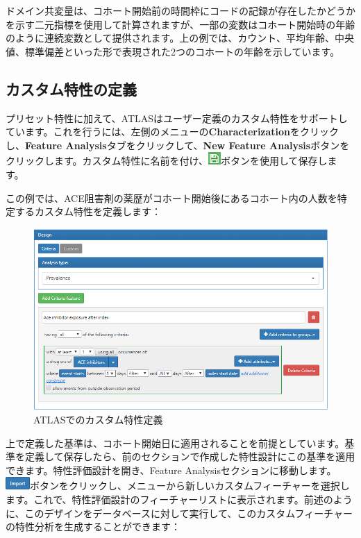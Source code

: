 \documentclass[
  11pt]{book}
\theoremstyle{definition}
\theoremstyle{definition}
\theoremstyle{definition}
\theoremstyle{definition}
\theoremstyle{remark}
\begin{document}
ドメイン共変量は、コホート開始前の時間枠にコードの記録が存在したかどうかを示す二元指標を使用して計算されますが、一部の変数はコホート開始時の年齢のように連続変数として提供されます。上の例では、カウント、平均年齢、中央値、標準偏差といった形で表現された2つのコホートの年齢を示しています。

\subsection{カスタム特性の定義}\label{ux30abux30b9ux30bfux30e0ux7279ux6027ux306eux5b9aux7fa9}

プリセット特性に加えて、ATLASはユーザー定義のカスタム特性をサポートしています。これを行うには、左側のメニューの\textbf{Characterization}をクリックし、\textbf{Feature Analysis}タブをクリックして、\textbf{New Feature Analysis}ボタンをクリックします。カスタム特性に名前を付け、\includegraphics{images/PopulationLevelEstimation/save.png}ボタンを使用して保存します。

この例では、ACE阻害剤の薬歴がコホート開始後にあるコホート内の人数を特定するカスタム特性を定義します：

\begin{figure}

{\centering \includegraphics[width=1\linewidth]{images/Characterization/atlasCharacterizationCustomFeature} 

}

\caption{ATLASでのカスタム特性定義}\label{fig:atlasCharacterizationCustomFeature}
\end{figure}

上で定義した基準は、コホート開始日に適用されることを前提としています。基準を定義して保存したら、前のセクションで作成した特性設計にこの基準を適用できます。特性評価設計を開き、Feature Analysisセクションに移動します。\includegraphics{images/Characterization/atlasImportButton.png}ボタンをクリックし、メニューから新しいカスタムフィーチャーを選択します。これで、特性評価設計のフィーチャーリストに表示されます。前述のように、このデザインをデータベースに対して実行して、このカスタムフィーチャーの特性分析を生成することができます：
\end{document}
